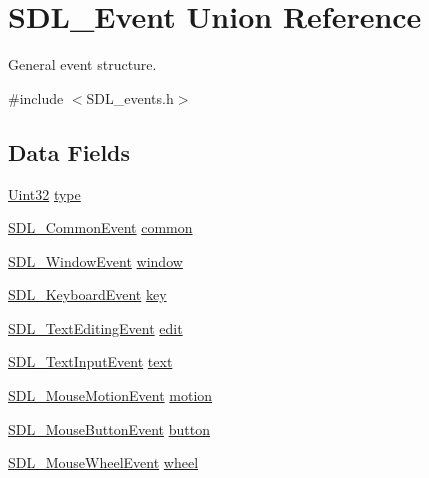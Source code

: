 \hypertarget{union_s_d_l___event}{}\section{S\+D\+L\+\_\+\+Event Union Reference}
\label{union_s_d_l___event}


General event structure.  




{\ttfamily \#include $<$S\+D\+L\+\_\+events.\+h$>$}

\subsection*{Data Fields}
\begin{DoxyCompactItemize}
\item 
\hyperlink{_s_d_l__stdinc_8h_add440eff171ea5f55cb00c4a9ab8672d}{Uint32} \hyperlink{union_s_d_l___event_aa40a9b05c3154032b9f2d7220e9f08dc}{type}
\item 
\hyperlink{struct_s_d_l___common_event}{S\+D\+L\+\_\+\+Common\+Event} \hyperlink{union_s_d_l___event_a4f63dd7ac333bd53cd0b4a7436b8653c}{common}
\item 
\hyperlink{struct_s_d_l___window_event}{S\+D\+L\+\_\+\+Window\+Event} \hyperlink{union_s_d_l___event_a83e92ef7347f0ea66977d7edd8129058}{window}
\item 
\hyperlink{struct_s_d_l___keyboard_event}{S\+D\+L\+\_\+\+Keyboard\+Event} \hyperlink{union_s_d_l___event_a2944bdaafa644e5dd1007a8514d73977}{key}
\item 
\hyperlink{struct_s_d_l___text_editing_event}{S\+D\+L\+\_\+\+Text\+Editing\+Event} \hyperlink{union_s_d_l___event_a5ebe320ebd3dade28db667edae0673ec}{edit}
\item 
\hyperlink{struct_s_d_l___text_input_event}{S\+D\+L\+\_\+\+Text\+Input\+Event} \hyperlink{union_s_d_l___event_aa5ef1fa3d7a6b36ccac384be7051491a}{text}
\item 
\hyperlink{struct_s_d_l___mouse_motion_event}{S\+D\+L\+\_\+\+Mouse\+Motion\+Event} \hyperlink{union_s_d_l___event_a8b74ec063362bbd2e4ec6d1a878eb0ca}{motion}
\item 
\hyperlink{struct_s_d_l___mouse_button_event}{S\+D\+L\+\_\+\+Mouse\+Button\+Event} \hyperlink{union_s_d_l___event_a84c8b783a58353ba95917b1756af68d9}{button}
\item 
\hyperlink{struct_s_d_l___mouse_wheel_event}{S\+D\+L\+\_\+\+Mouse\+Wheel\+Event} \hyperlink{union_s_d_l___event_a64774818699f12da4c6160fd5ec72200}{wheel}
\item 

\end{DoxyCompactItemize}
